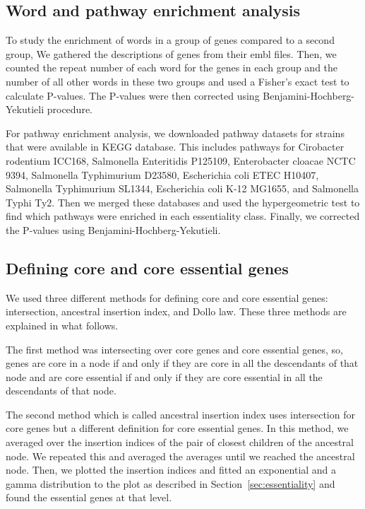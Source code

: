 \documentclass[12pt,letterpaper]{article}
\begin{document}
\subsection{Word and pathway enrichment analysis}\label{sec:enrichment}
To study the enrichment of words in a group of genes compared to a second group, We gathered the descriptions of genes from their embl files. Then, we counted the repeat number of each word for the genes in each group and the number of all other words in these two groups and used a Fisher's exact test to calculate P-values. The P-values were then corrected using Benjamini-Hochberg-Yekutieli procedure.

For pathway enrichment analysis, we downloaded pathway datasets for strains that were available in KEGG database. This includes pathways for Cirobacter rodentium ICC168, Salmonella Enteritidis P125109, Enterobacter cloacae NCTC 9394, Salmonella Typhimurium D23580, Escherichia coli ETEC H10407, Salmonella Typhimurium SL1344, Escherichia coli K-12 MG1655, and Salmonella Typhi Ty2. Then we merged these databases and used the hypergeometric test to find which pathways were enriched in each essentiality class. Finally, we corrected the P-values using Benjamini-Hochberg-Yekutieli.

\subsection{Defining core and core essential genes}\label{sec:core}
We used three different methods for defining core and core essential genes: intersection, ancestral insertion index, and Dollo law. These three methods are explained in what follows.

The first method was intersecting over core genes and core essential genes, so, genes are core in a node if and only if they are core in all the descendants of that node and are core essential if and only if they are core essential in all the descendants of that node.

The second method which is called ancestral insertion index uses intersection for core genes but a different definition for core essential genes. In this method, we averaged over the insertion indices of the pair of closest children of the ancestral node. We repeated this and averaged the averages until we reached the ancestral node. Then, we plotted the insertion indices and fitted an exponential and a gamma distribution to the plot as described in Section~\ref{sec:essentiality} and found the essential genes at that level.
\end{document}
